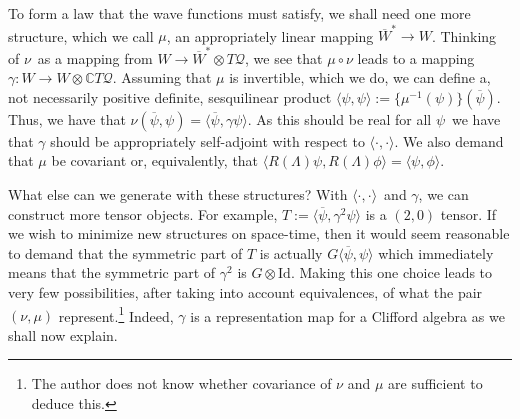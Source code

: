 \documentclass[11pt]{article}
\theoremstyle{remark}
\begin{document}
To form a law that the wave functions must satisfy, we shall need one
more structure, which we call $\mu$,  an appropriately linear
mapping  $\ensuremath{{\ensuremath{\overline{\ensuremath{W}}}}^{*}} \to \ensuremath{W}$. Thinking of \ensuremath{\nu}\ as a
mapping from $\ensuremath{W} \to \ensuremath{{\ensuremath{\overline{\ensuremath{W}}}}^{*}} \otimes \ensuremath{T \ensuremath{\mathcal{Q}}}$, we see that $\mu \circ
\ensuremath{\nu}$ leads to a mapping $\gamma : \ensuremath{W} \to \ensuremath{W} \otimes
\ensuremath{\mathbb{C}} \ensuremath{T \ensuremath{\mathcal{Q}}}$. Assuming that $\mu$ is invertible, which we do, we can define a,
not necessarily positive definite, 
sesquilinear product $\ensuremath{\langle \ensuremath{\psi}, \ensuremath{\psi} \rangle} \ensuremath{:=} \{\mu^{-1} (\ensuremath{\psi})\}
(\ensuremath{\overline{\ensuremath{\psi}}})$. 
Thus, we have that $\ensuremath{\nu}(\ensuremath{\overline{\ensuremath{\psi}}}, \ensuremath{\psi}) =
\ensuremath{\langle \ensuremath{\overline{\ensuremath{\psi}}}, \gamma \ensuremath{\psi} \rangle}$. As this should be real for all \ensuremath{\psi}\, we
have that $\gamma$ should be appropriately self-adjoint with
respect to $\ensuremath{\langle \cdot, \cdot \rangle}$. We also demand that $\mu$ be
covariant or, equivalently, that 
$\ensuremath{\langle R(\Lambda) \ensuremath{\psi}, R(\Lambda) \phi \rangle} =
\ensuremath{\langle \ensuremath{\psi}, \phi \rangle}$. 

What else can we generate with these structures? With \ensuremath{\langle \cdot, \cdot \rangle}\ and
$\gamma$, we can construct more tensor objects. For example,
$T \ensuremath{:=} \ensuremath{\langle \ensuremath{\overline{\ensuremath{\psi}}}, \gamma^2 \ensuremath{\psi} \rangle}$ 
is a $(2,0)$ tensor. If we wish to minimize
new structures on space-time, then it would seem reasonable to demand
that the symmetric part of $T$ is actually $G
\ensuremath{\langle \ensuremath{\overline{\ensuremath{\psi}}}, \ensuremath{\psi} \rangle}$ which immediately means that
 the symmetric part of $\gamma^2$ is 
$G \otimes \ensuremath{\text{Id}}$. Making
this one  choice leads to very few possibilities,
after taking into account equivalences, of
what the pair $(\ensuremath{\nu}, \mu)$ represent.\footnote{The 
author does not know whether covariance of $\ensuremath{\nu}$ and $\mu$ are
sufficient to deduce this.} Indeed, $\gamma$ is a
representation map for a Clifford algebra as we shall now explain. 
\end{document}
